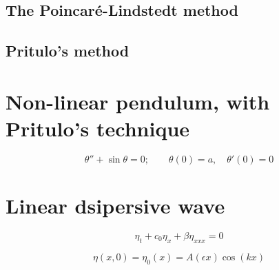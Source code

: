 \documentclass[11pt,letter, swedish, english
]{article}
\begin{document}
\subsection{The Poincaré-Lindstedt method}

\subsection{Pritulo's method}



\section{Non-linear pendulum, with Pritulo's technique}

\begin{equation}
\theta''+\sin\theta =0;\qquad
\theta(0)=a,\quad \theta'(0)=0
\end{equation}


\section{Linear dsipersive wave}


\begin{equation}
\eta_t + c_0\eta_{x}+\beta\eta_{xxx}=0
\end{equation}

\begin{equation}
\eta(x, 0)=\eta_0(x)=A(\epsilon x)\cos(kx)
\end{equation}
\end{document}

